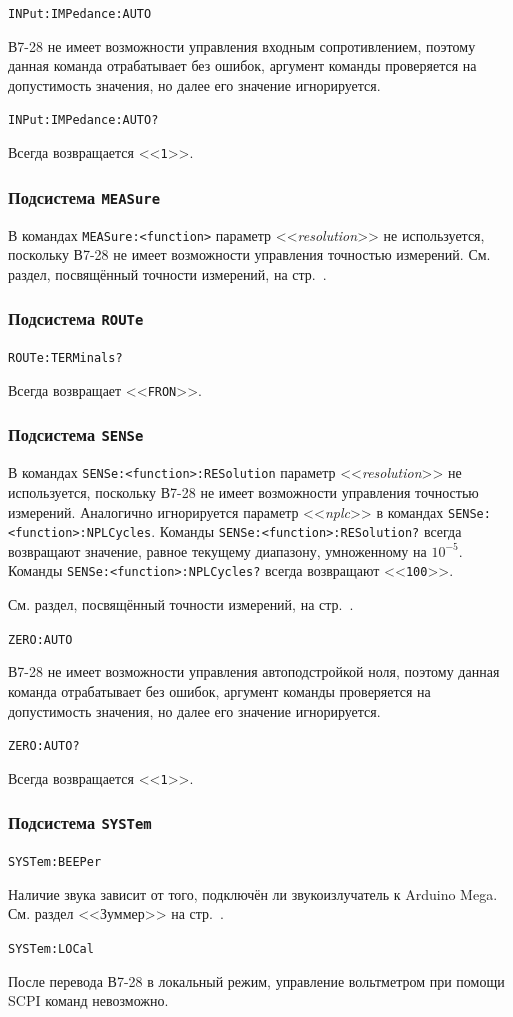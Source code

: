 \documentclass[12pt, a4paper]{article}
\newcommand{\V}{\mbox{В7-28}}
\newcommand{\Arduino}{Arduino Mega}
\newcommand{\CMD}[1]{{\tt #1}}
\newcommand{\PARAM}[1]{<<{\it #1}>>}
\newcommand{\RESPONSE}[1]{<<{\tt #1}>>}
\newcommand{\SUBSYSTEMSECTION}[1]{\subsubsection{Подсистема \CMD{#1}}}
\newcommand{\CMDSECTION}[1]{\CMD{#1}  }
\begin{document}
\CMDSECTION{INPut:IMPedance:AUTO}

\V{} не имеет возможности управления входным сопротивлением, поэтому данная команда отрабатывает без ошибок, аргумент команды проверяется на допустимость значения, но далее его значение игнорируется.

\CMDSECTION{INPut:IMPedance:AUTO?}

Всегда возвращается \RESPONSE{1}.

\SUBSYSTEMSECTION{MEASure}

В командах \CMD{MEASure:<function>} параметр \PARAM{resolution} не используется, поскольку \V{} не имеет возможности управления точностью измерений. См. раздел, посвящённый точности измерений, на стр.~\pageref{sec_precision}.

\SUBSYSTEMSECTION{ROUTe}

\CMDSECTION{ROUTe:TERMinals?}

Всегда возвращает \RESPONSE{FRON}.

\SUBSYSTEMSECTION{SENSe}

В командах \CMD{SENSe:<function>:RESolution} параметр \PARAM{resolution} не используется, поскольку \V{} не имеет возможности управления точностью измерений. Аналогично игнорируется параметр \PARAM{nplc} в командах \CMD{SENSe:<function>:NPLCycles}. Команды \CMD{SENSe:<function>:RESolution?} всегда возвращают значение, равное текущему диапазону, умноженному на $10^{-5}$. Команды \CMD{SENSe:<function>:NPLCycles?} всегда возвращают \RESPONSE{100}.

См. раздел, посвящённый точности измерений, на стр.~\pageref{sec_precision}.

\CMDSECTION{ZERO:AUTO}

\V{} не имеет возможности управления автоподстройкой ноля, поэтому данная команда отрабатывает без ошибок, аргумент команды проверяется на допустимость значения, но далее его значение игнорируется.

\CMDSECTION{ZERO:AUTO?}

Всегда возвращается \RESPONSE{1}.

\SUBSYSTEMSECTION{SYSTem}

\CMDSECTION{SYSTem:BEEPer}

Наличие звука зависит от того, подключён ли звукоизлучатель к \Arduino{}. См. раздел <<Зуммер>> на стр.~\pageref{sec_zummer}.

\CMDSECTION{SYSTem:LOCal}

После перевода \V{} в локальный режим, управление вольтметром при помощи SCPI команд невозможно.
\end{document}
